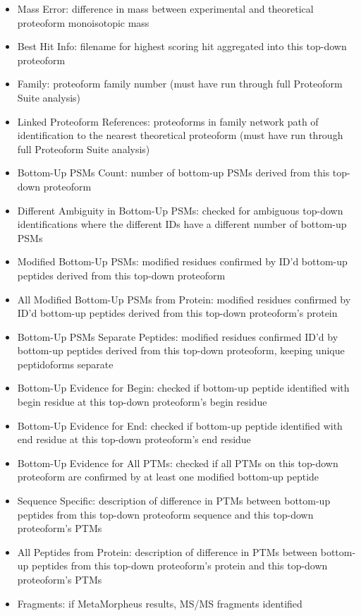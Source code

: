 \begin{itemize}
\begin{itemize}
		\item Mass Error: difference in mass between experimental and theoretical proteoform monoisotopic mass
		\item Best Hit Info: filename for highest scoring hit aggregated into this top-down proteoform
		\item Family: proteoform family number (must have run through full Proteoform Suite analysis)
		\item Linked Proteoform References: proteoforms in family network path of identification to the nearest theoretical proteoform (must have run through full Proteoform Suite analysis)
		\item Bottom-Up PSMs Count: number of bottom-up PSMs derived from this top-down proteoform
		\item Different Ambiguity in Bottom-Up PSMs: checked for ambiguous top-down identifications where the different IDs have a different number of bottom-up PSMs
		\item Modified Bottom-Up PSMs: modified residues confirmed by ID'd bottom-up peptides derived from this top-down proteoform
		\item All Modified Bottom-Up PSMs from Protein: modified residues confirmed by ID'd bottom-up peptides derived from this top-down proteoform's protein
		\item Bottom-Up PSMs Separate Peptides: modified residues confirmed ID'd by bottom-up peptides derived from this top-down proteoform, keeping unique peptidoforms separate
		\item Bottom-Up Evidence for Begin: checked if bottom-up peptide identified with begin residue at this top-down proteoform's begin residue
		\item Bottom-Up Evidence for End: checked if bottom-up peptide identified with end residue at this top-down proteoform's end residue
		\item Bottom-Up Evidence for All PTMs: checked if all PTMs on this top-down proteoform are confirmed by at least one modified bottom-up peptide
		\item Sequence Specific: description of difference in PTMs between bottom-up peptides from this top-down proteoform sequence and this top-down proteoform's PTMs
		\item All Peptides from Protein: description of difference in PTMs between bottom-up peptides from this top-down proteoform's protein and this top-down proteoform's PTMs
		\item Fragments: if MetaMorpheus results, MS/MS fragments identified

\end{itemize}
\end{itemize}
